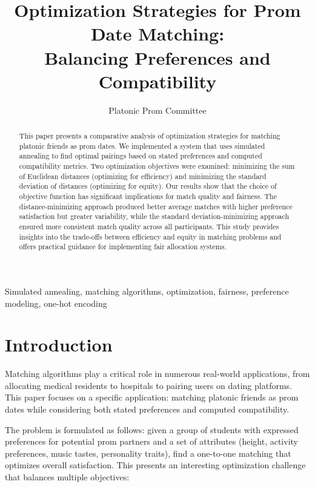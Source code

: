 \documentclass[10pt,journal,compsoc]{IEEEtran}
\begin{document}
\title{Optimization Strategies for Prom Date Matching: \\Balancing Preferences and Compatibility}

\author{Platonic Prom Committee}

\maketitle

\begin{abstract}
This paper presents a comparative analysis of optimization strategies for matching platonic friends as prom dates. We implemented a system that uses simulated annealing to find optimal pairings based on stated preferences and computed compatibility metrics. Two optimization objectives were examined: minimizing the sum of Euclidean distances (optimizing for efficiency) and minimizing the standard deviation of distances (optimizing for equity). Our results show that the choice of objective function has significant implications for match quality and fairness. The distance-minimizing approach produced better average matches with higher preference satisfaction but greater variability, while the standard deviation-minimizing approach ensured more consistent match quality across all participants. This study provides insights into the trade-offs between efficiency and equity in matching problems and offers practical guidance for implementing fair allocation systems.
\end{abstract}

\begin{IEEEkeywords}
Simulated annealing, matching algorithms, optimization, fairness, preference modeling, one-hot encoding
\end{IEEEkeywords}

\section{Introduction}
Matching algorithms play a critical role in numerous real-world applications, from allocating medical residents to hospitals to pairing users on dating platforms. This paper focuses on a specific application: matching platonic friends as prom dates while considering both stated preferences and computed compatibility.

The problem is formulated as follows: given a group of students with expressed preferences for potential prom partners and a set of attributes (height, activity preferences, music tastes, personality traits), find a one-to-one matching that optimizes overall satisfaction. This presents an interesting optimization challenge that balances multiple objectives:
\end{document}
